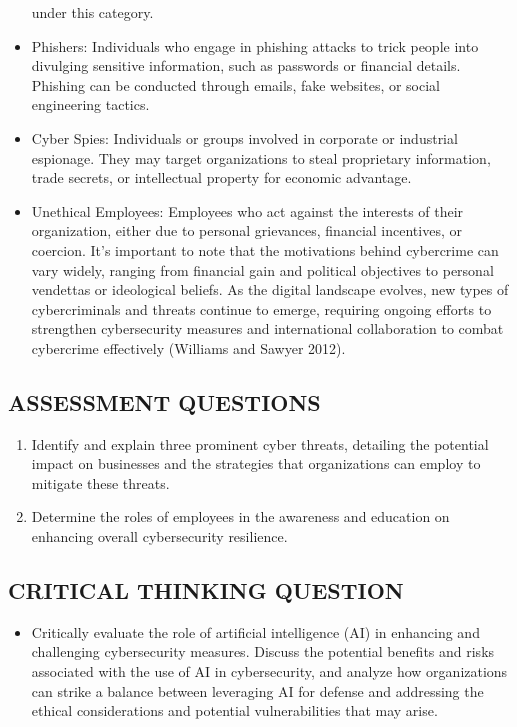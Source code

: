 \documentclass[
  letterpaper,
  DIV=11,
  numbers=noendperiod]{scrreprt}
\providecommand{\tightlist}{%
  \setlength{\itemsep}{0pt}\setlength{\parskip}{0pt}}\usepackage{longtable,booktabs,array}
\begin{document}
\begin{itemize}
  under this category.
\item
  Phishers: Individuals who engage in phishing attacks to trick people
  into divulging sensitive information, such as passwords or financial
  details. Phishing can be conducted through emails, fake websites, or
  social engineering tactics.
\item
  Cyber Spies: Individuals or groups involved in corporate or industrial
  espionage. They may target organizations to steal proprietary
  information, trade secrets, or intellectual property for economic
  advantage.
\item
  Unethical Employees: Employees who act against the interests of their
  organization, either due to personal grievances, financial incentives,
  or coercion. It's important to note that the motivations behind
  cybercrime can vary widely, ranging from financial gain and political
  objectives to personal vendettas or ideological beliefs. As the
  digital landscape evolves, new types of cybercriminals and threats
  continue to emerge, requiring ongoing efforts to strengthen
  cybersecurity measures and international collaboration to combat
  cybercrime effectively (Williams and Sawyer 2012).
\end{itemize}

\subsection{ASSESSMENT QUESTIONS}\label{assessment-questions-1}

\begin{enumerate}
\def\labelenumi{\arabic{enumi}.}
\tightlist
\item
  Identify and explain three prominent cyber threats, detailing the
  potential impact on businesses and the strategies that organizations
  can employ to mitigate these threats.
\item
  Determine the roles of employees in the awareness and education on
  enhancing overall cybersecurity resilience.
\end{enumerate}

\subsection{CRITICAL THINKING
QUESTION}\label{critical-thinking-question}

\begin{itemize}
\tightlist
\item
  Critically evaluate the role of artificial intelligence (AI) in
  enhancing and challenging cybersecurity measures. Discuss the
  potential benefits and risks associated with the use of AI in
  cybersecurity, and analyze how organizations can strike a balance
  between leveraging AI for defense and addressing the ethical
  considerations and potential vulnerabilities that may arise.
\end{itemize}
\end{document}
